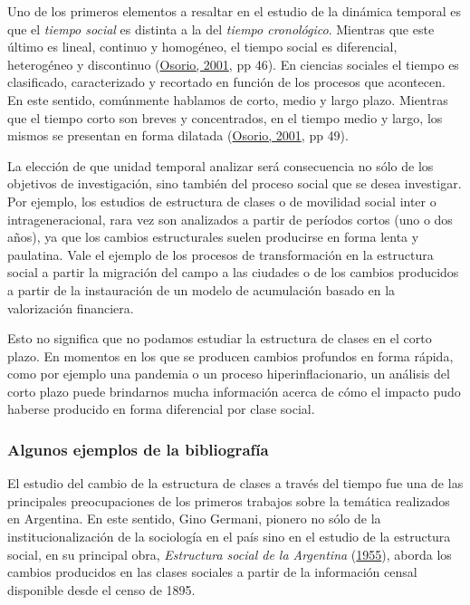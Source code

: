 \documentclass[
]{article}
\begin{document}
Uno de los primeros elementos a resaltar en el estudio de la dinámica temporal es que el \emph{tiempo social} es distinta a la del \emph{tiempo cronológico}. Mientras que este último es lineal, continuo y homogéneo, el tiempo social es diferencial, heterogéneo y discontinuo (\protect\hyperlink{ref-Osorio2001}{Osorio, 2001}, pp 46). En ciencias sociales el tiempo es clasificado, caracterizado y recortado en función de los procesos que acontecen. En este sentido, comúnmente hablamos de corto, medio y largo plazo. Mientras que el tiempo corto son breves y concentrados, en el tiempo medio y largo, los mismos se presentan en forma dilatada (\protect\hyperlink{ref-Osorio2001}{Osorio, 2001}, pp 49).

La elección de que unidad temporal analizar será consecuencia no sólo de los objetivos de investigación, sino también del proceso social que se desea investigar. Por ejemplo, los estudios de estructura de clases o de movilidad social inter o intrageneracional, rara vez son analizados a partir de períodos cortos (uno o dos años), ya que los cambios estructurales suelen producirse en forma lenta y paulatina. Vale el ejemplo de los procesos de transformación en la estructura social a partir la migración del campo a las ciudades o de los cambios producidos a partir de la instauración de un modelo de acumulación basado en la valorización financiera.

Esto no significa que no podamos estudiar la estructura de clases en el corto plazo. En momentos en los que se producen cambios profundos en forma rápida, como por ejemplo una pandemia o un proceso hiperinflacionario, un análisis del corto plazo puede brindarnos mucha información acerca de cómo el impacto pudo haberse producido en forma diferencial por clase social.

\hypertarget{algunos-ejemplos-de-la-bibliografuxeda}{%
\subsubsection{Algunos ejemplos de la bibliografía}\label{algunos-ejemplos-de-la-bibliografuxeda}}

El estudio del cambio de la estructura de clases a través del tiempo fue una de las principales preocupaciones de los primeros trabajos sobre la temática realizados en Argentina. En este sentido, Gino Germani, pionero no sólo de la institucionalización de la sociología en el país sino en el estudio de la estructura social, en su principal obra, \emph{Estructura social de la Argentina} (\protect\hyperlink{ref-Germani1955}{1955}), aborda los cambios producidos en las clases sociales a partir de la información censal disponible desde el censo de 1895.
\end{document}
